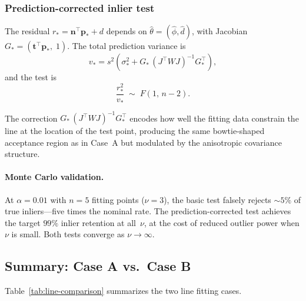\documentclass[11pt]{article}
\begin{document}
\subsubsection{Prediction-corrected inlier test}

The residual $r_* = \mathbf{n}^\top \mathbf{p}_* + d$ depends on
$\hat\theta = (\hat\phi, \hat{d})$, with Jacobian
$G_* = (\mathbf{t}^\top \mathbf{p}_*,\; 1)$.
The total prediction variance is
\begin{equation}
  v_* = s^2 \left(\sigma_*^2 + G_*\, (J^\top W J)^{-1} G_*^\top\right),
\end{equation}
and the test is
\begin{equation}
  \boxed{
    \frac{r_*^2}{v_*} \;\sim\; F(1,\, n-2).
  }
\end{equation}

The correction
$G_*\, (J^\top W J)^{-1} G_*^\top$
encodes how well the fitting data constrain the line at the
location of the test point, producing the same bowtie-shaped
acceptance region as in Case~A but modulated by the anisotropic
covariance structure.

\paragraph{Monte Carlo validation.}
At $\alpha = 0.01$ with $n = 5$ fitting points ($\nu = 3$), the basic
test falsely rejects ${\sim}5\%$ of true inliers---five
times the nominal rate. The prediction-corrected test achieves the
target $99\%$ inlier retention at all~$\nu$, at the cost of reduced
outlier power when $\nu$ is small. Both tests converge as
$\nu \to \infty$.

\subsection{Summary: Case A vs.\ Case B}

Table~\ref{tab:line-comparison} summarizes the two line fitting cases.
\end{document}
